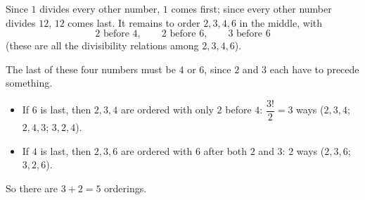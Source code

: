 Since $1$ divides every other number, $1$ comes first; since every other number divides $12$, $12$ comes last. It remains to order $2,3,4,6$ in the middle, with
\[2\text{ before }4,\qquad2\text{ before }6,\qquad3\text{ before }6\]
(these are all the divisibility relations among $2,3,4,6$).

The last of these four numbers must be $4$ or $6$, since $2$ and $3$ each have to precede something.
\begin{itemize}
\item If $6$ is last, then $2,3,4$ are ordered with only $2$ before $4$: $\dfrac{3!}{2}=3$ ways ($2,3,4$; $2,4,3$; $3,2,4$).
\item If $4$ is last, then $2,3,6$ are ordered with $6$ after both $2$ and $3$: $2$ ways ($2,3,6$; $3,2,6$).
\end{itemize}
So there are $3+2=\boxed{5}$ orderings.
